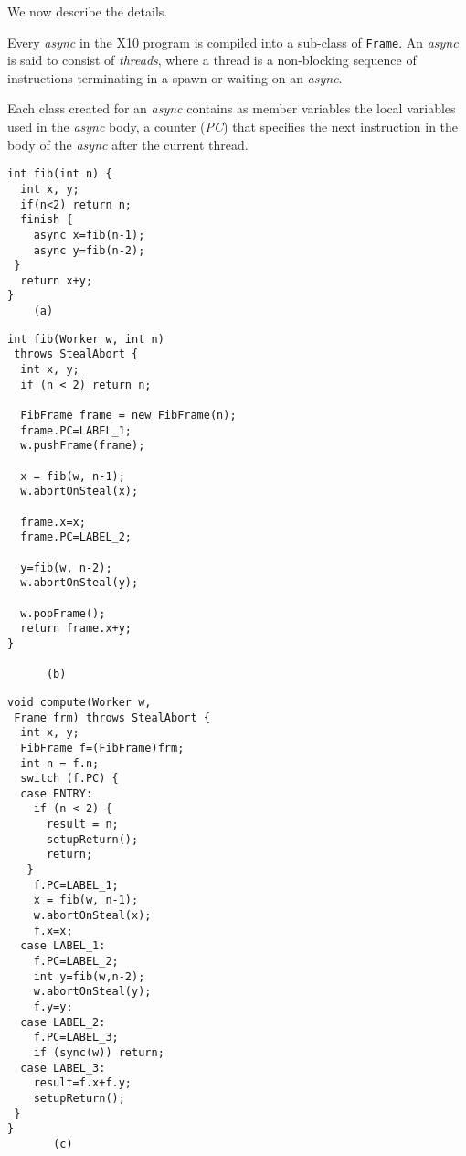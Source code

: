 \documentclass[10pt]{article}
\numberwithin{equation}{section}
\def\Xten{{\sf X10}}
\begin{document}
We now describe the details.

Every \emph{async} in the \Xten{} program is compiled into a sub-class
of {\tt Frame}. An \emph{async} is said to consist of {\em threads},
where a thread is a non-blocking sequence of instructions terminating
in a spawn or waiting on an \emph{async}.

Each class created for an \emph{async} contains as member variables the local
variables used in the \emph{async} body, a counter ({\em PC}) that specifies
the next instruction in the body of the \emph{async} after the current
thread.

\begin{figure*}
\begin{minipage}{0.25\textwidth}
\scriptsize
\begin{verbatim}
int fib(int n) {
  int x, y;
  if(n<2) return n;
  finish {
    async x=fib(n-1);
    async y=fib(n-2);
 }
  return x+y;
}
    (a)
\end{verbatim}
\end{minipage}%
\begin{minipage}{0.4\textwidth}
\scriptsize
\begin{verbatim}
int fib(Worker w, int n) 
 throws StealAbort { 
  int x, y;
  if (n < 2) return n;

  FibFrame frame = new FibFrame(n);
  frame.PC=LABEL_1;
  w.pushFrame(frame);

  x = fib(w, n-1);
  w.abortOnSteal(x);

  frame.x=x;
  frame.PC=LABEL_2;

  y=fib(w, n-2);
  w.abortOnSteal(y);

  w.popFrame();
  return frame.x+y;
}

      (b)
\end{verbatim}
\end{minipage}%
\begin{minipage}{0.45\textwidth}
\scriptsize
\begin{verbatim}
void compute(Worker w, 
 Frame frm) throws StealAbort {
  int x, y;
  FibFrame f=(FibFrame)frm;
  int n = f.n;
  switch (f.PC) {
  case ENTRY: 
    if (n < 2) {
      result = n;
      setupReturn();
      return;
   }
    f.PC=LABEL_1;
    x = fib(w, n-1);
    w.abortOnSteal(x);
    f.x=x;
  case LABEL_1: 
    f.PC=LABEL_2;
    int y=fib(w,n-2);
    w.abortOnSteal(y);
    f.y=y;
  case LABEL_2: 
    f.PC=LABEL_3;
    if (sync(w)) return;
  case LABEL_3:
    result=f.x+f.y;
    setupReturn();
 }
}
       (c)
\end{verbatim}
\end{minipage}%
\caption{(a) \Xten{} program for Fibonacci. (b) Fast version. (c) Slow version}%
\label{fig:fib-ill}
\end{figure*}
\end{document}
